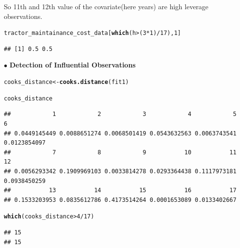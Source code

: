 \documentclass[10pt, a4paper]{article}\usepackage[]{graphicx}\usepackage[]{xcolor}
\makeatletter
\newcommand{\hlnum}[1]{\textcolor[rgb]{0.686,0.059,0.569}{#1}}%
\newcommand{\hlopt}[1]{\textcolor[rgb]{0,0,0}{#1}}%
\newcommand{\hlstd}[1]{\textcolor[rgb]{0.345,0.345,0.345}{#1}}%
\newcommand{\hlkwb}[1]{\textcolor[rgb]{0.69,0.353,0.396}{#1}}%
\newcommand{\hlkwd}[1]{\textcolor[rgb]{0.737,0.353,0.396}{\textbf{#1}}}%
\newenvironment{kframe}{%
 \def\at@end@of@kframe{}%
 \ifinner\ifhmode%
  \def\at@end@of@kframe{\end{minipage}}%
  \begin{minipage}{\columnwidth}%
 \fi\fi%
 \def\FrameCommand##1{\hskip\@totalleftmargin \hskip-\fboxsep
 \colorbox{shadecolor}{##1}\hskip-\fboxsep
     \hskip-\linewidth \hskip-\@totalleftmargin \hskip\columnwidth}%
 \MakeFramed {\advance\hsize-\width
   \@totalleftmargin\z@ \linewidth\hsize
   \@setminipage}}%
 {\par\unskip\endMakeFramed%
 \at@end@of@kframe}
\newenvironment{knitrout}{}{} %
\makeatother
\begin{document}
So 11th and 12th value of the covariate(here years) are high leverage observations.

\begin{knitrout}
\color{fgcolor}\begin{kframe}
\begin{alltt}
\hlstd{tractor_maintainance_cost_data[}\hlkwd{which}\hlstd{(h} \hlopt{>} \hlstd{(}\hlnum{3} \hlopt{*} \hlnum{1}\hlstd{)}\hlopt{/}\hlnum{17}\hlstd{),} \hlnum{1}\hlstd{]}
\end{alltt}
\begin{verbatim}
## [1] 0.5 0.5
\end{verbatim}
\end{kframe}
\end{knitrout}

\newpage

$\bullet$ \textbf{Detection of Influential Observations}

\begin{knitrout}
\color{fgcolor}\begin{kframe}
\begin{alltt}
\hlstd{cooks_distance} \hlkwb{<-} \hlkwd{cooks.distance}\hlstd{(fit1)}

\hlstd{cooks_distance}
\end{alltt}
\begin{verbatim}
##            1            2            3            4            5            6 
## 0.0449145449 0.0088651274 0.0068501419 0.0543632563 0.0063743541 0.0123854097 
##            7            8            9           10           11           12 
## 0.0056293342 0.1909969103 0.0033814278 0.0293364438 0.1117973181 0.0938450259 
##           13           14           15           16           17 
## 0.1533203953 0.0835612786 0.4173514264 0.0001653089 0.0133402667
\end{verbatim}
\end{kframe}
\end{knitrout}

\begin{knitrout}
\color{fgcolor}\begin{kframe}
\begin{alltt}
\hlkwd{which}\hlstd{(cooks_distance} \hlopt{>} \hlnum{4}\hlopt{/}\hlnum{17}\hlstd{)}
\end{alltt}
\begin{verbatim}
## 15 
## 15
\end{verbatim}
\end{kframe}
\end{knitrout}
\end{document}
